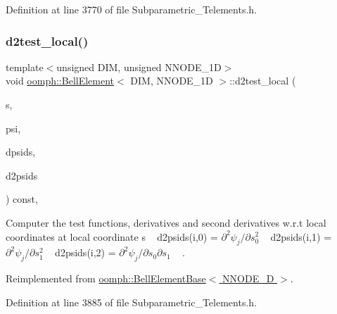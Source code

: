 Definition at line 3770 of file Subparametric\+\_\+\+Telements.\+h.

\mbox{\label{classoomph_1_1BellElement_a2d7e1df2f16e344721161ac2de099483}} 
\subsubsection{\texorpdfstring{d2test\+\_\+local()}{d2test\_local()}}
{\footnotesize\ttfamily template$<$unsigned D\+IM, unsigned N\+N\+O\+D\+E\+\_\+1D$>$ \\
void \hyperlink{classoomph_1_1BellElement}{oomph\+::\+Bell\+Element}$<$ D\+IM, N\+N\+O\+D\+E\+\_\+1D $>$\+::d2test\+\_\+local (\begin{DoxyParamCaption}\item[{const \hyperlink{classoomph_1_1Vector}{Vector}$<$ double $>$ \&}]{s,  }\item[{\hyperlink{classoomph_1_1Shape}{Shape} \&}]{psi,  }\item[{\hyperlink{classoomph_1_1DShape}{D\+Shape} \&}]{dpsids,  }\item[{\hyperlink{classoomph_1_1DShape}{D\+Shape} \&}]{d2psids }\end{DoxyParamCaption}) const\hspace{0.3cm}{\ttfamily [inline]}, {\ttfamily [virtual]}}



Computer the test functions, derivatives and second derivatives w.\+r.\+t local coordinates at local coordinate s ~\newline
d2psids(i,0) = $ \partial^2 \psi_j / \partial s_0^2 $ ~\newline
d2psids(i,1) = $ \partial^2 \psi_j / \partial s_1^2 $ ~\newline
d2psids(i,2) = $ \partial^2 \psi_j / \partial s_0 \partial s_1 $ ~\newline
. 



Reimplemented from \hyperlink{classoomph_1_1BellElementBase_ae576f35c4faeeed475dff67a8b31ac37}{oomph\+::\+Bell\+Element\+Base$<$ N\+N\+O\+D\+E\+\_\+D $>$}.



Definition at line 3885 of file Subparametric\+\_\+\+Telements.\+h.

